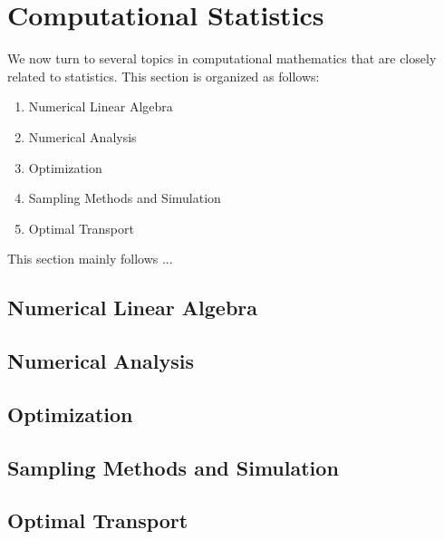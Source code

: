 \newpage
\section{Computational Statistics}
We now turn to several topics in computational mathematics that are closely related to statistics. This section is organized as follows:
\begin{enumerate}
    \item Numerical Linear Algebra
    \item Numerical Analysis
    \item Optimization
    \item Sampling Methods and Simulation
    \item Optimal Transport
\end{enumerate}

This section mainly follows ...


\subsection{Numerical Linear Algebra}

\subsection{Numerical Analysis}

\subsection{Optimization}

\subsection{Sampling Methods and Simulation}

\subsection{Optimal Transport}